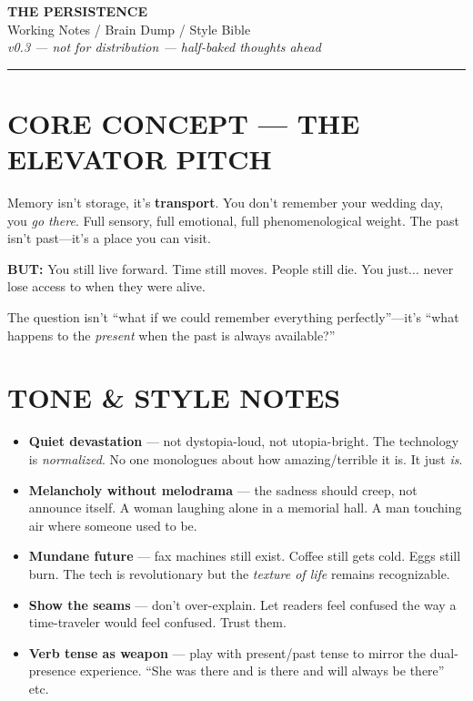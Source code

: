 \documentclass[11pt,letterpaper]{article}
\begin{document}
\begin{center}
{\LARGE\textbf{THE PERSISTENCE}}\\[0.5em]
{\large Working Notes / Brain Dump / Style Bible}\\[0.3em]
{\small\textit{v0.3 --- not for distribution --- half-baked thoughts ahead}}
\end{center}

\vspace{1em}
\hrule
\vspace{1em}

\section*{CORE CONCEPT --- THE ELEVATOR PITCH}

Memory isn't storage, it's \textbf{transport}. You don't remember your wedding day, you \textit{go there}. Full sensory, full emotional, full phenomenological weight. The past isn't past---it's a place you can visit.

\textbf{BUT:} You still live forward. Time still moves. People still die. You just... never lose access to when they were alive.

The question isn't ``what if we could remember everything perfectly''---it's ``what happens to the \textit{present} when the past is always available?''

\vspace{1em}

\section*{TONE \& STYLE NOTES}

\begin{itemize}[leftmargin=*]
    \item \textbf{Quiet devastation} --- not dystopia-loud, not utopia-bright. The technology is \textit{normalized}. No one monologues about how amazing/terrible it is. It just \textit{is}.
    
    \item \textbf{Melancholy without melodrama} --- the sadness should creep, not announce itself. A woman laughing alone in a memorial hall. A man touching air where someone used to be.
    
    \item \textbf{Mundane future} --- fax machines still exist. Coffee still gets cold. Eggs still burn. The tech is revolutionary but the \textit{texture of life} remains recognizable.
    
    \item \textbf{Show the seams} --- don't over-explain. Let readers feel confused the way a time-traveler would feel confused. Trust them.
    
    \item \textbf{Verb tense as weapon} --- play with present/past tense to mirror the dual-presence experience. ``She was there and is there and will always be there'' etc.
\end{itemize}
\end{document}
